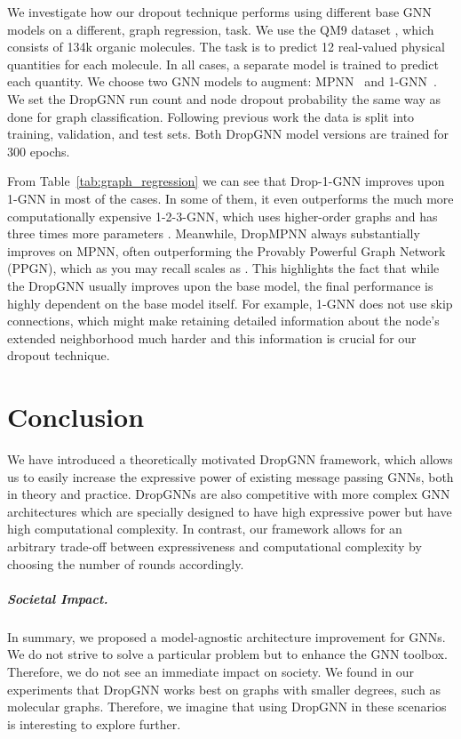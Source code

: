 \documentclass{article}
\begin{document}
We investigate how our dropout technique performs using different base GNN models on a different, graph regression, task. We use the QM9 dataset \citep{ramakrishnan2014quantum}, which consists of 134k organic molecules. The task is to predict 12 real-valued physical quantities for each molecule. In all cases, a separate model is trained to predict each quantity. We choose two GNN models to augment: MPNN~\citep{gilmer2017neural} and 1-GNN~\citep{morris2019weisfeiler}.
We set the DropGNN run count and node dropout probability the same way as done for graph classification. Following previous work \citep{morris2019weisfeiler, maron2019provably} the data is split into  training,  validation, and  test sets. Both DropGNN model versions are trained for 300 epochs.

From Table~\ref{tab:graph_regression} we can see that Drop-1-GNN improves upon 1-GNN in most of the cases. In some of them, it even outperforms the much more computationally expensive 1-2-3-GNN, which uses higher-order graphs and has three times more parameters \citep{morris2019weisfeiler}. Meanwhile, DropMPNN always substantially improves on MPNN, often outperforming the Provably Powerful Graph Network (PPGN), which as you may recall scales as . This highlights the fact that while the DropGNN usually improves upon the base model, the final performance is highly dependent on the base model itself. For example, 1-GNN does not use skip connections, which might make retaining detailed information about the node's extended neighborhood much harder and this information is crucial for our dropout technique. 


\section{Conclusion}\label{sec:conclusion}

We have introduced a theoretically motivated DropGNN framework, which allows us to easily increase the expressive power of existing message passing GNNs, both in theory and practice. 
DropGNNs are also competitive with more complex GNN architectures which are specially designed to have high expressive power but have high computational complexity. In contrast, our framework allows for an arbitrary trade-off between expressiveness and computational complexity by choosing the number of rounds  accordingly.


\subparagraph{Societal Impact.}
In summary, we proposed a model-agnostic architecture improvement for GNNs. We do not strive to solve a particular problem but to enhance the GNN toolbox. Therefore, we do not see an immediate impact on society. We found in our experiments that DropGNN works best on graphs with smaller degrees, such as molecular graphs. Therefore, we imagine that using DropGNN in these scenarios is interesting to explore further.
\end{document}
